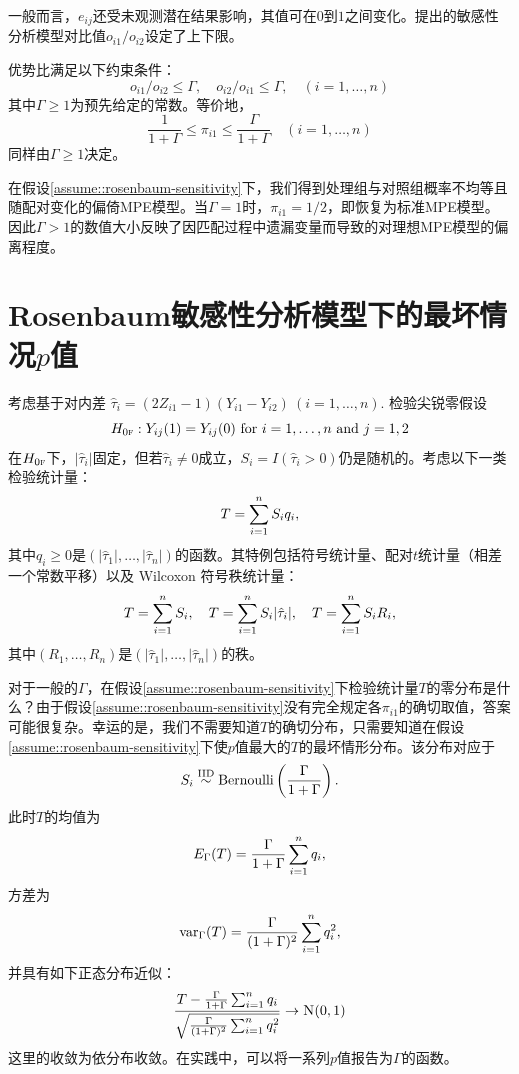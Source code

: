 一般而言，$e_{ij}$还受未观测潜在结果影响，其值可在$0$到$1$之间变化。\citet{rosenbaum1987sensitivity}提出的敏感性分析模型对比值$o_{i1}/o_{i2} $设定了上下限。 

\begin{assumption}[Rosenbaum敏感性分析模型]\label{assume::rosenbaum-sensitivity}
优势比满足以下约束条件：
$$
o_{i1}/o_{i2} \leq \Gamma,\quad
o_{i2}/o_{i1} \leq \Gamma, \quad (i=1, \ldots, n)
$$
其中$\Gamma \geq  1$为预先给定的常数。等价地，
$$ 
\frac{1}{1+\Gamma } \leq 
\pi_{i1} \leq \frac{\Gamma}{1+\Gamma} \quad (i=1, \ldots, n)
$$
同样由$\Gamma \geq  1$决定。
\end{assumption}


在假设\ref{assume::rosenbaum-sensitivity}下，我们得到处理组与对照组概率不均等且随配对变化的偏倚MPE模型。当$\Gamma = 1$时，$\pi_{i1} = 1/2 $，即恢复为标准MPE模型。因此$\Gamma > 1$的数值大小反映了因匹配过程中遗漏变量而导致的对理想MPE模型的偏离程度。 
 
 
 
 \section{Rosenbaum敏感性分析模型下的最坏情况$p$值}


考虑基于对内差
$
\hat{\tau}_i = (2Z_{i1} - 1) (Y_{i1} - Y_{i2}) \  (i=1,\ldots, n). 
$
检验尖锐零假设
$$
H_{0\textsc{f}}: Y_{ij}(1) = Y_{ij}(0) \text{ for } i = 1,\ldots, n \text{ and } j=1,2
$$
在$H_{0\textsc{f}}$下，$|\hat{\tau}_i|$固定，但若$\hat{\tau}_i \neq 0$成立，$S_i = I(\hat{\tau}_i > 0)$仍是随机的。考虑以下一类检验统计量：
$$
T = \sum_{i=1}^n S_i q_i,
$$
其中$q_i\geq 0$是$(|\hat{\tau}_1|, \ldots, |\hat{\tau}_n|)$的函数。其特例包括符号统计量、配对$t$统计量（相差一个常数平移）以及 Wilcoxon 符号秩统计量：
$$
T = \sum_{i=1}^n S_i,\quad T = \sum_{i=1}^n S_i |\hat{\tau}_i|,\quad T = \sum_{i=1}^n S_i R_i,
$$
其中$(R_1,\ldots, R_n)$是$(|\hat{\tau}_1|, \ldots, |\hat{\tau}_n|)$的秩。

对于一般的$\Gamma$，在假设\ref{assume::rosenbaum-sensitivity}下检验统计量$T$的零分布是什么？由于假设\ref{assume::rosenbaum-sensitivity}没有完全规定各$\pi_{i1}$的确切取值，答案可能很复杂。幸运的是，我们不需要知道$T$的确切分布，只需要知道在假设\ref{assume::rosenbaum-sensitivity}下使$p$值最大的$T$的最坏情形分布。该分布对应于
$$
S_i \stackrel{\textup{IID}}{\sim}  \text{Bernoulli}\left(  \frac{ \Gamma}{ 1+\Gamma} \right).
$$
此时$T$的均值为
$$
E_\Gamma( T ) = \frac{\Gamma}{1+\Gamma} \sum_{i=1}^n q_i, 
$$
方差为
$$
\textup{var}_\Gamma( T ) = \frac{\Gamma}{(1+\Gamma)^2} \sum_{i=1}^n q_i^2,
$$
并具有如下正态分布近似：
$$
\frac{T -\frac{\Gamma}{1+\Gamma} \sumn q_i }{ \sqrt{ \frac{\Gamma}{(1+\Gamma)^2} \sumn q_i^2  }} \rightarrow  \N01 
$$
这里的收敛为依分布收敛。在实践中，可以将一系列$p$值报告为$\Gamma$的函数。 


